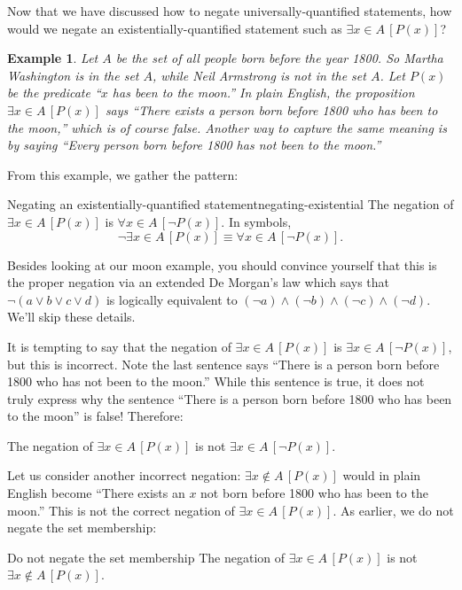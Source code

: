 \documentclass{book}
\newcounter{ekcounter}%
\theoremstyle{ekimcustom}
\newtheorem{example}[ekcounter]{Example}
\begin{document}
Now that we have discussed how to negate universally-quantified statements, how would we negate an existentially-quantified statement such as $\exists x \in A\,[P(x)]$? 
\begin{example}
Let $A$ be the set of all people born before the year 1800. So Martha Washington is in the set $A$, while Neil Armstrong is not in the set $A$. Let $P(x)$ be the predicate ``$x$ has been to the moon.'' In plain English, the proposition $\exists x \in A\,[P(x)]$ says ``There exists a person born before 1800 who has been to the moon,'' which is of course false. Another way to capture the same meaning is by saying ``Every person born before 1800 has not been to the moon.''
\end{example}
From this example, we gather the pattern:
\begin{bmethod}{Negating an existentially-quantified statement}{negating-existential}
The negation of $\exists x \in A\,[P(x)]$ is $\forall x \in A\,[\neg P(x)]$. In symbols,
\[ \neg \exists x \in A\,[P(x)] \equiv \forall x \in A\,[\neg P(x)].\]
\end{bmethod}
Besides looking at our moon example, you should convince yourself that this is the proper negation via an extended De Morgan's law which says that $\neg(a \vee b \vee c \vee d)$ is logically equivalent to $(\neg a) \wedge (\neg b) \wedge (\neg c) \wedge (\neg d)$. We'll skip these details.

It is tempting to say that the negation of $\exists x \in A\,[P(x)]$ is $\exists x \in A\,[\neg P(x)]$, but this is incorrect. Note the last sentence says ``There is a person born before 1800 who has not been to the moon.'' While this sentence is true, it does not truly express why the sentence ``There is a person born before 1800 who has been to the moon'' is false! Therefore:
\begin{bwarning}{}{}
The negation of $\exists x \in A\,[P(x)]$ is not $\exists x \in A\,[\neg P(x)]$.
\end{bwarning}

Let us consider another incorrect negation: $\exists x \not\in A\,[P(x)]$ would in plain English become ``There exists an $x$ not born before 1800 who has been to the moon.'' This is not the correct negation of $\exists x \in A\,[P(x)]$. As earlier, we do not negate the set membership:
\begin{bwarning}{Do not negate the set membership}{}
The negation of $\exists x \in A\,[P(x)]$ is not $\exists x \not\in A\,[P(x)]$.
\end{bwarning}
\end{document}
